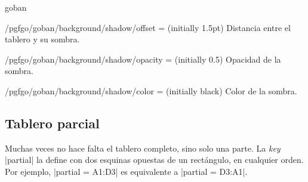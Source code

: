 \begin{environment}{{goban}}
	\begin{key}{/pgfgo/goban/background/shadow/offset = (initially 1.5pt)}
		Distancia entre el tablero y su sombra.
		\begin{codeexample}[]

			\begin{goban}[background = {shadow}, name = a]
			\end{goban}

			\begin{goban}[background = {shadow = {offset = 4pt}}, resume = a]
			\end{goban}
		\end{codeexample}
	\end{key}

	\begin{key}{/pgfgo/goban/background/shadow/opacity = (initially 0.5)}
		Opacidad de la sombra.
	\end{key}

	\begin{key}{/pgfgo/goban/background/shadow/color = (initially black)}
		Color de la sombra.
	\end{key}

	\subsection{Tablero parcial}
	\label{subsec:parcial}
	
	Muchas veces no hace falta el tablero completo, sino solo una parte. La \emph{key} |partial| la define con dos esquinas opuestas de un rectángulo, en cualquier orden. Por ejemplo, |partial = A1:D3| es equivalente a |partial = D3:A1|.
	
	\begin{figure}[H]
		\centering
		
\end{figure}
\end{environment}
